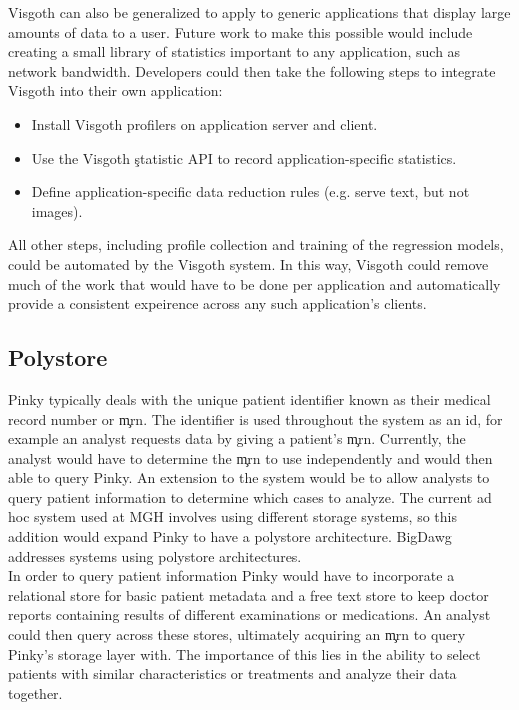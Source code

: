Visgoth can also be generalized to apply to generic applications that display
large amounts of data to a user. Future work to make this possible would
include creating a small library of statistics important to any application,
such as network bandwidth. Developers could then take the following steps to
integrate Visgoth into their own application:

\begin{itemize}
  \item Install Visgoth profilers on application server and client.
  \item Use the Visgoth \c{statistic} API to record application-specific
    statistics.
  \item Define application-specific data reduction rules (e.g. serve text, but
    not images).
\end{itemize}

All other steps, including profile collection and training of the regression
models, could be automated by the Visgoth system. In this way, Visgoth could
remove much of the work that would have to be done per application and
automatically provide a consistent expeirence across any such application's
clients.

\subsection{Polystore}

Pinky typically deals with the unique patient identifier known as their medical
record number or \c{mrn}. The identifier is used throughout the system as an
id, for example an analyst requests data by giving a patient's \c{mrn}.
Currently, the analyst would have to determine the \c{mrn} to use independently
and would then able to query Pinky. An extension to the system would be to
allow analysts to query patient information to determine which cases to
analyze. The current ad hoc system used at MGH involves using different storage
systems, so this addition would expand Pinky to have a polystore architecture.
BigDawg \cite{bigdawg} addresses systems using polystore architectures. \\

In order to query patient information Pinky would have to incorporate a
relational store for basic patient metadata and a free text store to keep
doctor reports containing results of different examinations or medications. An
analyst could then query across these stores, ultimately acquiring an \c{mrn}
to query Pinky's storage layer with. The importance of this lies in the ability
to select patients with similar characteristics or treatments and analyze their
data together.


